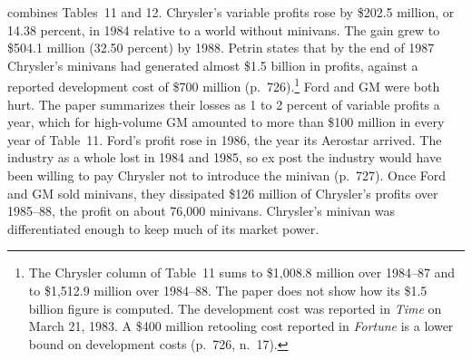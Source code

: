   combines Tables~11 and 12. Chrysler's variable
profits rose by \$202.5 million, or 14.38 percent, in 1984 relative to a world without minivans. The gain grew to
\$504.1 million (32.50 percent) by 1988. Petrin states that by the end of 1987 Chrysler's minivans had generated almost
\$1.5 billion in profits, against a reported development cost of \$700 million (p.~726).\footnote{The Chrysler column
of Table~11 sums to \$1,008.8 million over 1984--87 and to \$1,512.9 million over 1984--88. The paper does not show how
its \$1.5 billion figure is computed. The development cost was reported in \textit{Time} on March 21, 1983. A
\$400 million retooling cost reported in \textit{Fortune} is a lower bound on development costs (p.~726, n.~17).}
Ford and GM were both hurt. The paper summarizes their losses as 1 to 2 percent of variable profits a year, which for
high-volume GM amounted to more than \$100 million in every year of Table~11. Ford's profit rose in 1986, the year its
Aerostar arrived. The industry as a whole lost
in 1984 and 1985, so ex post the industry would have been willing to pay Chrysler not to introduce the minivan
(p.~727). Once Ford and GM sold minivans, they dissipated \$126 million of Chrysler's profits over 1985--88, the
profit on about 76,000 minivans. Chrysler's minivan was differentiated enough to keep much of its market power.

